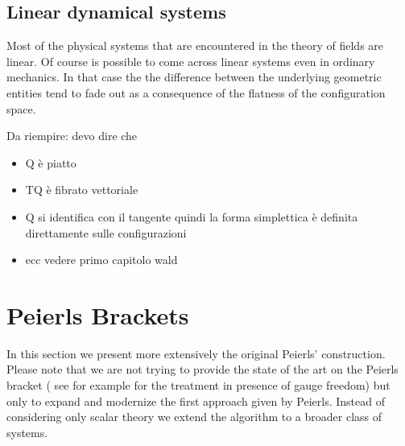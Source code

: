 \documentclass[Main]{subfiles}
\begin{document}
	\danger	 
	 
	
	\subsection{Linear dynamical systems}	
	Most of the physical systems that are encountered in the theory of fields are linear.
	Of course is possible to come across linear systems even in ordinary mechanics. 
	In that case the the difference between the underlying geometric entities tend to fade out as a consequence of the flatness of the configuration space.
	
	\danger
	
	Da riempire: devo dire che 
	\begin{itemize}
		\item Q è piatto
		\item TQ è fibrato vettoriale
		\item Q si identifica con il tangente quindi la forma simplettica è definita direttamente sulle configurazioni
		\item ecc vedere primo capitolo wald
	\end{itemize}
	
	
	\danger
		
\newpage
	\section{Peierls Brackets}
	In this section we present more extensively the original Peierls' construction. 
	Please note that we are not trying to provide the state of the art on the Peierls bracket ( see for example \cite{Khavkine2014} for the treatment in presence of gauge freedom) but only to expand and modernize the first approach given by Peierls.
	Instead of considering only scalar theory we extend the algorithm to a broader class of systems.
	
\end{document}
